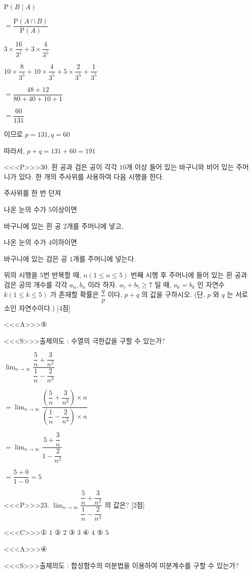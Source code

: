 \documentclass{oblivoir}
\begin{document}
$\mathrm{P}(B \mid A)$

$=\dfrac{\mathrm{P}(A \cap B)}{\mathrm{P}(A)}$

$3 \times \dfrac{16}{3^{5}}+3 \times \dfrac{4}{3^{5}}$

$10 \times \dfrac{8}{3^{5}}+10 \times \dfrac{4}{3^{5}}+5 \times \dfrac{2}{3^{5}}+\dfrac{1}{3^{5}}$

$=\dfrac{48+12}{80+40+10+1}$

$=\dfrac{60}{131}$

이므로 $p=131, q=60$

따라서, $p+q=131+60=191$


<<<P>>>30. 흰 공과 검은 공이 각각 $10$개 이상 들어 있는 바구니와 비어 있는 주머니가 있다. 한 개의 주사위를 사용하여 다음 시행을 한다.

주사위를 한 번 던져

나온 눈의 수가 $5$이상이면

바구니에 있는 흰 공 $2$개를 주머니에 넣고,

나온 눈의 수가 $4$이하이면

바구니에 있는 검은 공 $1$개를 주머니에 넣는다.

위의 시행을 $5$번 반복할 때, $n(1 \leq n \leq 5)$ 번째 시행 후 주머니에 들어 있는 흰 공과 검은 공의 개수를 각각 $a_{n}, b_{n}$ 이라 하자. $a_{5}+b_{5} \geq 7$ 일 때, $a_{k}=b_{k}$ 인 자연수 $k(1 \leq k \leq 5)$ 가
존재할 확률은 $\dfrac{q}{p}$ 이다. $p+q$ 의 값을 구하시오. (단, $p$ 와 $q$ 는 서로소인 자연수이다.) [4점]


<<<A>>>⑤

<<<S>>>출제의도 : 수열의 극한값을 구할 수 있는가?

$\displaystyle\lim _{n \rightarrow \infty} \dfrac{\dfrac{5}{n}+\dfrac{3}{n^{2}}}{\dfrac{1}{n}-\dfrac{2}{n^{3}}}$

$=\displaystyle\lim _{n \rightarrow \infty} \dfrac{\left(\dfrac{5}{n}+\dfrac{3}{n^{2}}\right) \times n}{\left(\dfrac{1}{n}-\dfrac{2}{n^{3}}\right) \times n}$

$=\displaystyle\lim _{n \rightarrow \infty} \dfrac{5+\dfrac{3}{n}}{1-\dfrac{2}{n^{2}}}$

$=\dfrac{5+0}{1-0}=5$


<<<P>>>23. $\displaystyle\lim _{n \rightarrow \infty} \dfrac{\dfrac{5}{n}+\dfrac{3}{n^{2}}}{\dfrac{1}{n}-\dfrac{2}{n^{3}}}$ 의 값은? [2점]

<<<C>>>① $1$
② $2$
③ $3$
④ $4$
⑤ $5$


<<<A>>>④

<<<S>>>출제의도 : 합성함수의 미분법을 이용하여 미분계수를 구할 수 있는가?
\end{document}
